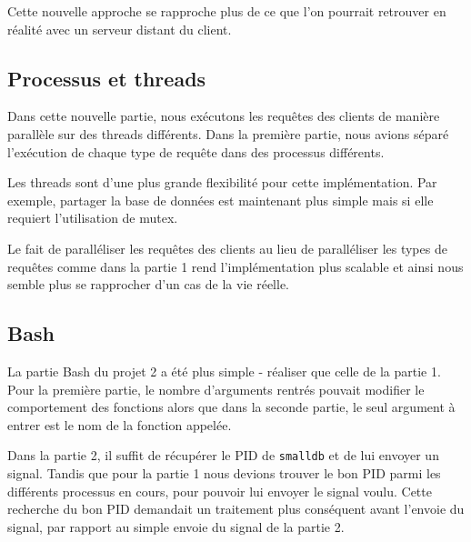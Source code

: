 \documentclass[utf8]{article}
\begin{document}
Cette nouvelle approche se rapproche plus de ce que l'on pourrait retrouver en réalité avec un serveur distant du client.


\subsection{Processus et threads}

Dans cette nouvelle partie, nous exécutons les requêtes des clients de manière parallèle sur des threads différents. Dans la première partie, nous avions séparé l'exécution de chaque type de requête dans des processus différents.

Les threads sont d'une plus grande flexibilité pour cette implémentation. Par exemple, partager la base de données est maintenant plus simple mais si elle requiert l'utilisation de mutex.

Le fait de paralléliser les requêtes des clients au lieu de paralléliser les types de requêtes comme dans la partie 1 rend l'implémentation plus scalable et ainsi nous semble plus se rapprocher d'un cas de la vie réelle.


\subsection{Bash}

La partie Bash du projet 2  a été plus simple - réaliser que celle de la partie 1.
Pour la première partie, le nombre d'arguments rentrés pouvait modifier le comportement des fonctions alors que dans la seconde partie, le seul argument à entrer est le nom de la fonction appelée.

Dans la partie 2, il suffit de récupérer le PID de \texttt{smalldb} et de lui envoyer un signal. Tandis que pour la partie 1 nous devions trouver le bon PID parmi les différents processus en cours, pour pouvoir lui envoyer le signal voulu. Cette recherche du bon PID demandait un traitement plus conséquent avant l'envoie du signal, par rapport au simple envoie du signal de la partie 2. 
\end{document}
